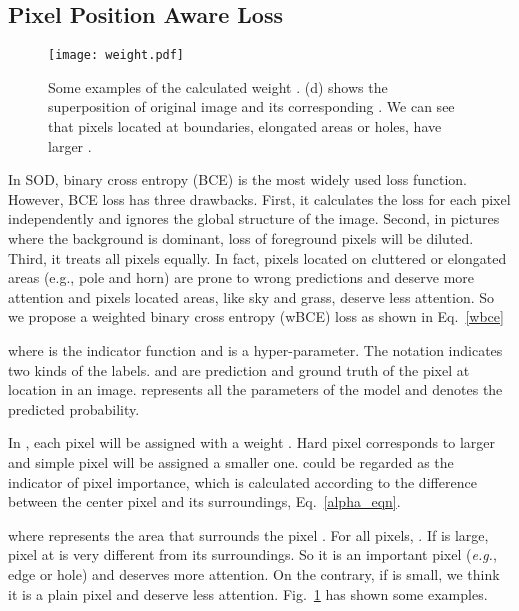 \documentclass[letterpaper]{article} \usepackage{aaai20}  \usepackage{times}  \usepackage{helvet} \usepackage{courier}  \usepackage[hyphens]{url}  \usepackage{graphicx} \urlstyle{rm} \def\UrlFont{\rm}  \usepackage{graphicx}  \frenchspacing  \setlength{\pdfpagewidth}{8.5in}  \setlength{\pdfpageheight}{11in}
\begin{document}
\subsection{Pixel Position Aware Loss}
\begin{figure}[htb]
  \centering
  \texttt{[image: weight.pdf]}
  \caption{Some examples of the calculated weight . (d) shows the superposition of original image and its corresponding . We can see that pixels located at boundaries, elongated areas or holes, have larger .}
  \label{alpha_fig}
\end{figure}
In SOD, binary cross entropy (BCE) is the most widely used loss function. However, BCE loss has three drawbacks. First, it calculates the loss for each pixel independently and ignores the global structure of the image. Second, in pictures where the background is dominant, loss of foreground pixels will be diluted. Third, it treats all pixels equally. In fact, pixels located on cluttered or elongated areas (e.g., pole and horn) are prone to wrong predictions and deserve more attention and pixels located areas, like sky and grass, deserve less attention. So we propose a weighted binary cross entropy (wBCE) loss as shown in Eq.~\ref{wbce}
\begin{small}

\end{small}
where  is the indicator function and  is a hyper-parameter.  The notation  indicates two kinds of the labels.  and  are prediction and ground truth of the pixel at location  in an image.  represents all the parameters of the model and  denotes the predicted probability.

In , each pixel will be assigned with a weight . Hard pixel corresponds to larger  and simple pixel will be assigned a smaller one.  could be regarded as the indicator of pixel importance, which is calculated according to the difference between the center pixel and its surroundings, Eq.~\ref{alpha_eqn}.

where  represents the area that surrounds the pixel . For all pixels, . If  is large, pixel at  is very different from its surroundings. So it is an important pixel ({\it e.g.}, edge or hole) and deserves more attention. On the contrary, if  is small, we think it is a plain pixel and deserve less attention. Fig.~\ref{alpha_fig} has shown some examples.
\end{document}

